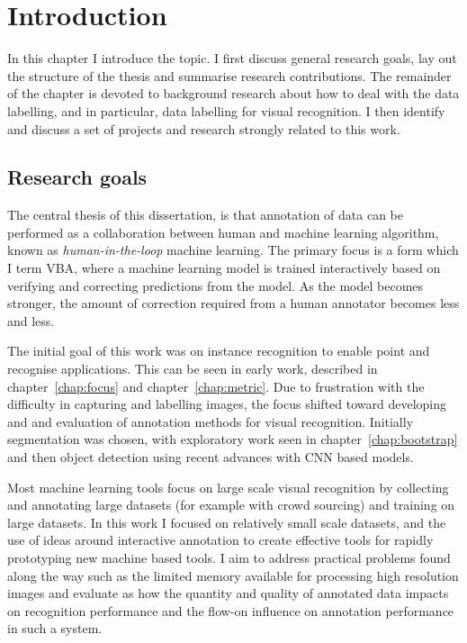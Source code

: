\chapter{Introduction}

In this chapter I introduce the topic. I first discuss general research goals, lay out the structure of the thesis and summarise research contributions. The remainder of the chapter is devoted to background research about  how to deal with the data labelling, and in particular, data labelling for visual recognition. I then identify and discuss a set of projects and research strongly related to this work. 


\section{Research goals}
\label{sec:research_goals}

The central thesis of this dissertation, is that annotation of data can be performed as a collaboration between human and machine learning algorithm, known as \emph{human-in-the-loop} machine learning. The primary focus is a form which I term \gls{VBA}, where a machine learning model is trained interactively based on verifying and correcting predictions from the model. As the model becomes stronger, the amount of correction required from a human annotator becomes less and less. 

The initial goal of this work was on instance recognition to enable point and recognise applications. This can be seen in early work, described in chapter~\ref{chap:focus} and chapter~\ref{chap:metric}. Due to frustration with the difficulty in capturing and labelling images, the focus shifted toward developing and and evaluation of annotation methods for visual recognition.  Initially segmentation was chosen, with exploratory work seen in chapter~\ref{chap:bootstrap} and then object detection using recent advances with \gls{CNN} based models.

Most machine learning tools focus on large scale visual recognition by collecting and annotating large datasets (for example with crowd sourcing) and training on large datasets. In this work I focused on relatively small scale datasets, and the use of ideas around interactive annotation to create effective tools for rapidly prototyping new machine based tools. I aim to address practical problems found along the way such as the limited memory available for processing high resolution images and evaluate as how the quantity and quality of annotated data impacts on recognition performance and the flow-on influence on annotation performance in such a system.

